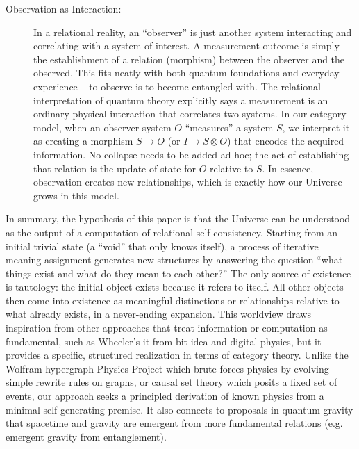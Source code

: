\documentclass{article}
\begin{document}
\begin{description}
\item[Observation as Interaction:] In a relational reality, an ``observer'' is just another system interacting and correlating with a system of interest. A measurement outcome is simply the establishment of a relation (morphism) between the observer and the observed. This fits neatly with both quantum foundations and everyday experience -- to observe is to become entangled with. The relational interpretation of quantum theory explicitly says a measurement is an ordinary physical interaction that correlates two systems\cite{rovelli1996}. In our category model, when an observer system $O$ ``measures'' a system $S$, we interpret it as creating a morphism $S \to O$ (or $I \to S \otimes O$) that encodes the acquired information. No collapse needs to be added ad hoc; the act of establishing that relation is the update of state for $O$ relative to $S$. In essence, observation creates new relationships, which is exactly how our Universe grows in this model.
\end{description}

In summary, the hypothesis of this paper is that the Universe can be understood as the output of a computation of relational self-consistency. Starting from an initial trivial state (a ``void'' that only knows itself), a process of iterative meaning assignment generates new structures by answering the question ``what things exist and what do they mean to each other?'' The only source of existence is tautology: the initial object exists because it refers to itself. All other objects then come into existence as meaningful distinctions or relationships relative to what already exists, in a never-ending expansion. This worldview draws inspiration from other approaches that treat information or computation as fundamental, such as Wheeler’s it-from-bit idea\cite{wheeler1989} and digital physics, but it provides a specific, structured realization in terms of category theory. Unlike the Wolfram hypergraph Physics Project which brute-forces physics by evolving simple rewrite rules on graphs\cite{wolfram2020}, or causal set theory which posits a fixed set of events, our approach seeks a principled derivation of known physics from a minimal self-generating premise. It also connects to proposals in quantum gravity that spacetime and gravity are emergent from more fundamental relations (e.g. emergent gravity from entanglement\cite{vanraamsdonk2010}).
\end{document}
